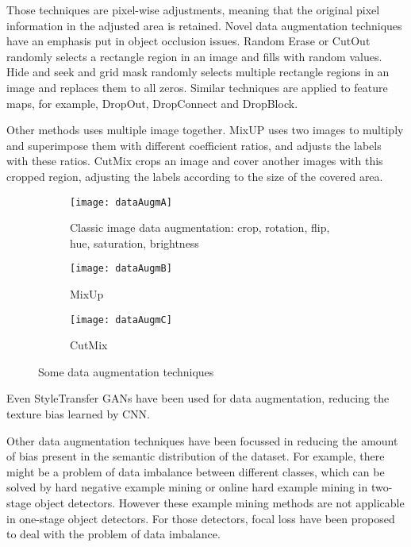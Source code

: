 Those techniques are pixel-wise adjustments, meaning that the original pixel information in the adjusted area is retained. Novel data augmentation techniques have an emphasis put in object occlusion issues. Random Erase\cite{randomErase} or CutOut\cite{cutOut} randomly selects a rectangle region in an image and fills with random values. Hide and seek\cite{hideSeek} and grid mask\cite{gridMask} randomly selects multiple rectangle regions in an image and replaces them to all zeros.  Similar techniques are applied to feature maps, for example, DropOut\cite{dropOut}, DropConnect\cite{dropConnect} and DropBlock\cite{dropBlock}.

Other methods uses multiple image together. MixUP\cite{mixUp} uses two images to multiply and superimpose them with different coefficient ratios, and adjusts the labels with these ratios. CutMix\cite{cutMix} crops an image and cover another images with this cropped region, adjusting the labels according to the size of the covered area.

\begin{figure}
     \centering
     \begin{subfigure}[b]{0.3\textwidth}
         \centering
         \texttt{[image: dataAugmA]}
         \caption{Classic image data augmentation: crop, rotation, flip, hue, saturation, brightness}
         \label{fig:classicAugm}
     \end{subfigure}
     \hfill
     \begin{subfigure}[b]{0.3\textwidth}
         \centering
         \texttt{[image: dataAugmB]}
         \caption{MixUp}
         \label{fig:mixup}
     \end{subfigure}
     \hfill
     \begin{subfigure}[b]{0.3\textwidth}
         \centering
         \texttt{[image: dataAugmC]}
         \caption{CutMix}
         \label{fig:cutMix}
     \end{subfigure}
        \caption{Some data augmentation techniques}
        \label{fig:dataAugm}
\end{figure}


Even StyleTransfer GANs\cite{styleTransfer} have been used for data augmentation, reducing the texture bias learned by CNN.

Other data augmentation techniques have been focussed in reducing the amount of bias present in the semantic distribution of the dataset. For example, there might be a problem of data imbalance between different classes, which can be solved by hard negative example mining\cite{hardNegMining} or online hard example mining\cite{onlineHard} in two-stage object detectors. However these example mining methods are not applicable in one-stage object detectors. For those detectors, focal loss\cite{focalLoss} have been proposed to deal with the problem of data imbalance. 

